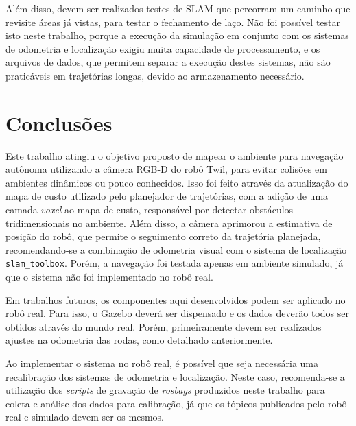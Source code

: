 \documentclass[repeatfields,xlists,xpacks,oneside,yearsonly]{ufrgscca}
\begin{document}
Além disso, devem ser realizados testes de SLAM que percorram um
caminho que revisite áreas já vistas, para testar o fechamento de
laço. Não foi possível testar isto neste trabalho, porque a execução
da simulação em conjunto com os sistemas de odometria e localização
exigiu muita capacidade de processamento, e os arquivos de dados, que
permitem separar a execução destes sistemas, não são praticáveis em
trajetórias longas, devido ao armazenamento necessário.

\chapter{Conclusões}
\label{conclusao}

Este trabalho atingiu o objetivo proposto de mapear o ambiente para
navegação autônoma utilizando a câmera RGB-D do robô Twil, para
evitar colisões em ambientes dinâmicos ou pouco conhecidos. Isso foi
feito através da atualização do mapa de custo utilizado pelo
planejador de trajetórias, com a adição de uma camada \textit{voxel}
ao mapa de custo, responsável por detectar obstáculos tridimensionais
no ambiente. Além disso, a câmera aprimorou a estimativa de posição
do robô, que permite o seguimento correto da trajetória planejada,
recomendando-se a combinação de odometria visual com o sistema de
localização \texttt{slam\_toolbox}. Porém, a navegação foi testada
apenas em ambiente simulado, já que o sistema não foi implementado no
robô real.

Em trabalhos futuros, os componentes aqui desenvolvidos podem ser
aplicado no robô real. Para isso, o Gazebo deverá ser dispensado e os
dados deverão todos ser obtidos através do mundo real. Porém,
primeiramente devem ser realizados ajustes na odometria das rodas,
como detalhado anteriormente.

Ao implementar o sistema no robô real, é possível que seja necessária
uma recalibração dos sistemas de odometria e localização. Neste caso,
recomenda-se a utilização dos \textit{scripts} de gravação de
\textit{rosbags} produzidos neste trabalho para coleta e análise dos
dados para calibração, já que os tópicos publicados pelo robô real e
simulado devem ser os mesmos.

\printbibliography

%
%
%
\end{document}
